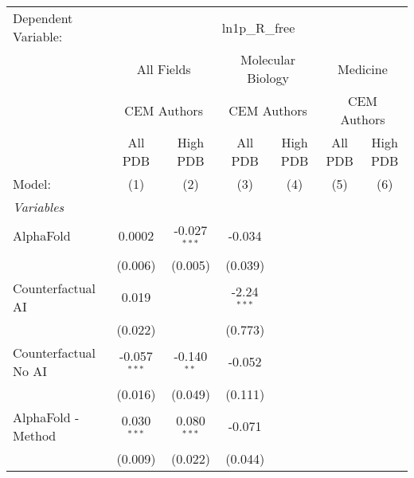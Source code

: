 \begingroup
\centering
\begin{tabular}{lcccccc}
   \tabularnewline \midrule \midrule
   Dependent Variable: & \multicolumn{6}{c}{ln1p\_R\_free}\\
 & \multicolumn{2}{c}{All Fields} & \multicolumn{2}{c}{Molecular Biology} & \multicolumn{2}{c}{Medicine} \\
\cmidrule(lr){2-3} \cmidrule(lr){4-5} \cmidrule(lr){6-7}
 & \multicolumn{2}{c}{CEM Authors} & \multicolumn{2}{c}{CEM Authors} & \multicolumn{2}{c}{CEM Authors} \\
\cmidrule(lr){2-3} \cmidrule(lr){4-5} \cmidrule(lr){6-7}
 & \multicolumn{1}{c}{All PDB} & \multicolumn{1}{c}{High PDB} & \multicolumn{1}{c}{All PDB} & \multicolumn{1}{c}{High PDB} & \multicolumn{1}{c}{All PDB} & \multicolumn{1}{c}{High PDB} \\
\cmidrule(lr){2-2} \cmidrule(lr){3-3} \cmidrule(lr){4-4} \cmidrule(lr){5-5} \cmidrule(lr){6-6} \cmidrule(lr){7-7}
   Model:                                                     & (1)            & (2)            & (3)           & (4) & (5) & (6)\\  
   \midrule
   \emph{Variables}\\
   AlphaFold                                                  & 0.0002         & -0.027$^{***}$ & -0.034        &     &     &   \\   
                                                              & (0.006)        & (0.005)        & (0.039)       &     &     &   \\   
   Counterfactual AI                                          & 0.019          &                & -2.24$^{***}$ &     &     &   \\   
                                                              & (0.022)        &                & (0.773)       &     &     &   \\   
   Counterfactual No AI                                       & -0.057$^{***}$ & -0.140$^{**}$  & -0.052        &     &     &   \\   
                                                              & (0.016)        & (0.049)        & (0.111)       &     &     &   \\   
   AlphaFold - Method                                         & 0.030$^{***}$  & 0.080$^{***}$  & -0.071        &     &     &   \\   
                                                              & (0.009)        & (0.022)        & (0.044)       &     &     &   \\   

\end{tabular}
